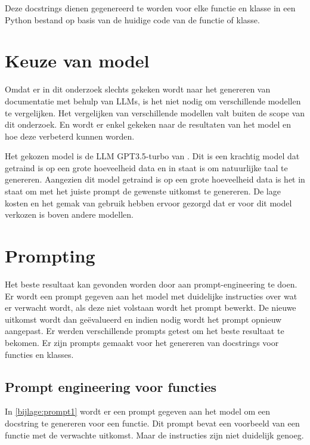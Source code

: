 Deze docstrings dienen gegenereerd te worden voor elke functie en klasse in een Python bestand op basis van de huidige code van de functie of klasse.

\section{Keuze van model}
\label{sec:bestanddocumentatie-model}

Omdat er in dit onderzoek slechts gekeken wordt naar het genereren van documentatie met behulp van LLMs, is het niet nodig om verschillende modellen te vergelijken.
Het vergelijken van verschillende modellen valt buiten de scope van dit onderzoek.
En wordt er enkel gekeken naar de resultaten van het model en hoe deze verbeterd kunnen worden.

Het gekozen model is de LLM GPT3.5-turbo van \textcite{OpenAI}.
Dit is een krachtig model dat getraind is op een grote hoeveelheid data en in staat is om natuurlijke taal te genereren.
Aangezien dit model getraind is op een grote hoeveelheid data is het in staat om met het juiste prompt de gewenste uitkomst te genereren.
De lage kosten en het gemak van gebruik hebben ervoor gezorgd dat er voor dit model verkozen is boven andere modellen.

\section{Prompting}
\label{sec:bestanddocumentatie-prompting}

Het beste resultaat kan gevonden worden door aan prompt-engineering te doen.
Er wordt een prompt gegeven aan het model met duidelijke instructies over wat er verwacht wordt, als deze niet volstaan wordt het prompt bewerkt.
De nieuwe uitkomst wordt dan geëvalueerd en indien nodig wordt het prompt opnieuw aangepast.
Er werden verschillende prompts getest om het beste resultaat te bekomen.
Er zijn prompts gemaakt voor het genereren van docstrings voor functies en klasses. 


\subsection{Prompt engineering voor functies}

In \ref{bijlage:prompt1} wordt er een prompt gegeven aan het model om een docstring te genereren voor een functie. 
Dit prompt bevat een voorbeeld van een functie met de verwachte uitkomst. 
Maar de instructies zijn niet duidelijk genoeg. 

